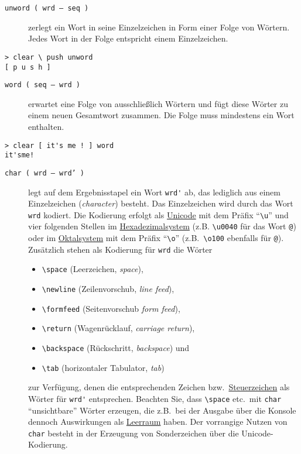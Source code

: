 \begin{description}
\item[\texttt{unword ( wrd -- seq )}] zerlegt ein Wort in seine Einzelzeichen in Form einer Folge von Wörtern. Jedes Wort in der Folge entspricht einem Einzelzeichen.
\end{description}

\begin{verbatim}
> clear \ push unword
[ p u s h ]
\end{verbatim}

\begin{description}
\item[\texttt{word ( seq -- wrd )}] erwartet eine Folge von ausschließlich Wörtern und fügt diese Wörter zu einem neuen Gesamtwort zusammen. Die Folge muss mindestens ein Wort enthalten.
\end{description}

\begin{verbatim}
> clear [ it's me ! ] word
it'sme!
\end{verbatim}

\begin{description}
\item[\texttt{char ( wrd -- wrd' )}] legt auf dem Ergebnisstapel ein Wort \verb|wrd'| ab, das lediglich aus einem Einzelzeichen (\emph{character}) besteht. Das Einzelzeichen wird durch das Wort \verb|wrd| kodiert. Die Kodierung erfolgt als \href{http://de.wikipedia.org/wiki/Unicode}{Unicode} mit dem Präfix "`\verb|\u|"' und vier folgenden Stellen im \href{http://de.wikipedia.org/wiki/Hexadezimalsystem}{Hexadezimalsystem} (z.B. \verb|\u0040| für das Wort \verb|@|) oder im \href{http://de.wikipedia.org/wiki/Oktalsystem}{Oktalsystem} mit dem Präfix "`\verb|\o|"' (z.B.\ \verb|\o100| ebenfalls für \verb|@|). Zusätzlich stehen als Kodierung für \verb|wrd| die Wörter
\begin{itemize}
\item \verb|\space| (Leerzeichen, \emph{space}),
\item \verb|\newline| (Zeilenvorschub, \emph{line feed}),
\item \verb|\formfeed| (Seitenvorschub \emph{form feed}),
\item \verb|\return| (Wagenrücklauf, \emph{carriage return}),
\item \verb|\backspace| (Rückschritt, \emph{backspace}) und
\item \verb|\tab| (horizontaler Tabulator, \emph{tab})
\end{itemize}
zur Verfügung, denen die entsprechenden Zeichen bzw.\ \href{http://de.wikipedia.org/wiki/Steuerzeichen}{Steuerzeichen} als Wörter für \verb|wrd'| entsprechen. Beachten Sie, dass \verb|\space| etc.\ mit \verb|char| "`unsichtbare"' Wörter erzeugen, die z.B.\ bei der Ausgabe über die Konsole dennoch Auswirkungen als \href{http://de.wikipedia.org/wiki/Leerraum}{Leerraum} haben. Der vorrangige Nutzen von \verb|char| besteht in der Erzeugung von Sonderzeichen über die Unicode-Kodierung.
\end{description}

